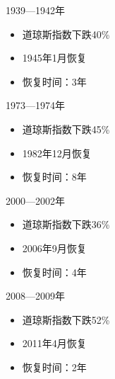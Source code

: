 1939—1942年

\begin{itemize}
\item 道琼斯指数下跌40\%
\item 1945年1月恢复
\item 恢复时间：3年
\end{itemize}

1973—1974年

\begin{itemize}
\item 道琼斯指数下跌45\%
\item 1982年12月恢复
\item 恢复时间：8年
\end{itemize}

2000—2002年

\begin{itemize}
\item 道琼斯指数下跌36\%
\item 2006年9月恢复
\item 恢复时间：4年
\end{itemize}

2008—2009年

\begin{itemize}
\item 道琼斯指数下跌52\%
\item 2011年4月恢复
\item 恢复时间：2年
\end{itemize}
